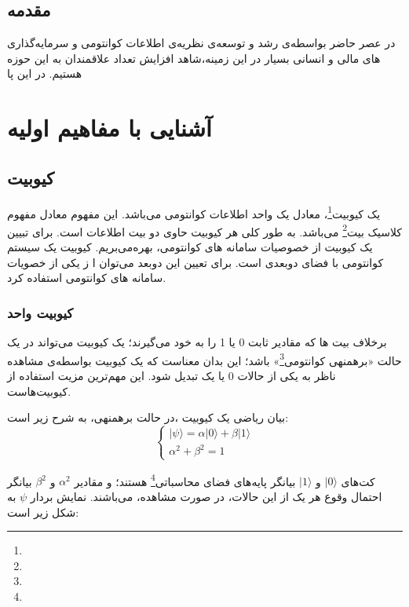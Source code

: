 \documentclass{book}
\begin{document}
\tableofcontents
\newpage
\section*{مقدمه}	
در عصر حاضر بواسطه‌ی رشد و توسعه‌ی نظریه‌ی اطلاعات کوانتومی و سرمایه‌گذاری های مالی و انسانی بسیار در این زمینه،‌شاهد افزایش تعداد علاقمندان به این حوزه هستیم. در این پا
\newpage
\chapter{آشنایی با مفاهیم اولیه}
\section{کیوبیت}

یک کیوبیت\footnote{}، معادل یک واحد اطلاعات کوانتومی می‌باشد. این مفهوم معادل مفهوم کلاسیک بیت\footnote{} می‌باشد. به طور کلی هر کیوبیت حاوی دو بیت اطلاعات است. برای تبیین یک کیوبیت از خصوصیات سامانه های کوانتومی، بهره‌می‌بریم. کیوبیت یک سیستم کوانتومی با فضای دوبعدی است. برای تعیین این دوبعد می‌توان ا ز یکی از خصویات سامانه های کوانتومی استفاده کرد. 
\subsection{کیوبیت‌ واحد}
برخلاف بیت ها که مقادیر ثابت 0 یا 1 را به خود می‌گیرند؛ یک کیوبیت می‌تواند در یک حالت «برهمنهی کوانتومی\footnote{}» باشد؛ این بدان معناست که یک کیوبیت بواسطه‌ی مشاهده ناظر به یکی از حالات 0 یا یک تبدیل شود. این مهم‌ترین مزیت استفاده از کیوبیت‌هاست. 

\pagebreak

بیان ریاضی یک کیوبیت ،در حالت برهمنهی، به شرح زیر است:
\vspace{0.5cm}
$$
\left\{
\begin{array}{ll}
	  \vert \psi \rangle = \alpha\vert 0 \rangle + \beta\vert 1 \rangle \\
	  \alpha^2 + \beta^2 = 1
\end{array}
\right.
$$

کت‌های $\vert 0 \rangle$ و $\vert 1 \rangle$ بیانگر پایه‌های فضای محاسباتی\footnote{} هستند؛ و مقادیر $\alpha^2$ و $\beta^2$ بیانگر احتمال وقوع هر یک از این حالات، در صورت مشاهده، می‌باشند. نمایش بردار $\psi$ به شکل زیر است:
\begin{center}
\end{center}
\end{document}
